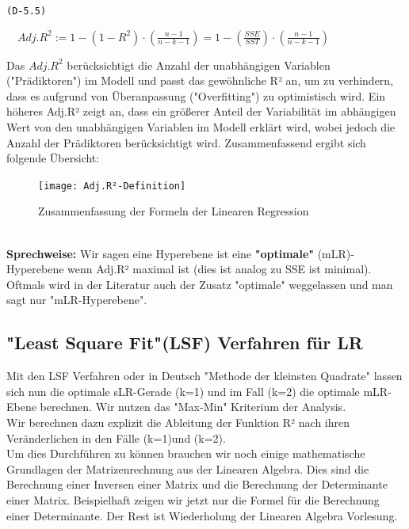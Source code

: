 \documentclass[12pt]{article}
\begin{document}
\begin{center}
\texttt{(D-5.5)}
\begin{large}
\textbf{$ \quad Adj.R^2 := 1 - (1 - R^2) \cdot (\frac{n-1}{n-k-1}) = 1 - (\frac{SSE}{SST}) \cdot (\frac{n-1}{n-k-1}) $}  \\[0.6cm] 
\end{large}     
\end{center}
%
Das $Adj.R^2$ berücksichtigt die Anzahl der unabhängigen Variablen ("Prädiktoren") im Modell und passt das gewöhnliche R² an, um zu verhindern, dass es aufgrund von Überanpassung ("Overfitting") zu optimistisch wird. Ein höheres Adj.R² zeigt an, dass ein größerer Anteil der Variabilität im abhängigen Wert von den unabhängigen Variablen im Modell erklärt wird, wobei jedoch die Anzahl der Prädiktoren berücksichtigt wird. Zusammenfassend ergibt sich folgende Übersicht:
\begin{figure}[htp]
  \centering
  \hspace*{-0.7cm} 
  \texttt{[image: Adj.R²-Definition]}
  \caption{Zusammenfassung der Formeln der Linearen Regression}     
  \label{fig:Zus-Formeln-LR}
\end{figure}
\\[10.5cm]
%
\textbf{Sprechweise:} Wir sagen eine Hyperebene ist eine \textbf{"optimale"} (mLR)- Hyperebene wenn Adj.R² maximal ist (dies ist analog zu SSE ist minimal). Oftmals wird in der Literatur auch der Zusatz "optimale" weggelassen und man sagt nur "mLR-Hyperebene".\\ 


\subsection{"Least Square Fit"(LSF) Verfahren für LR}

Mit den LSF Verfahren oder in Deutsch "Methode der kleinsten Quadrate" lassen sich nun die optimale sLR-Gerade (k=1) und im Fall (k=2) die optimale mLR-Ebene berechnen. Wir nutzen das "Max-Min" Kriterium der Analysis.\\
Wir berechnen dazu explizit die Ableitung der Funktion R² nach ihren Veränderlichen in den Fälle (k=1)und (k=2).\\
Um dies Durchführen zu können brauchen wir noch einige mathematische Grundlagen der Matrizenrechnung aus der Linearen Algebra. Dies sind die Berechnung einer Inversen einer Matrix  und die Berechnung der Determinante einer Matrix. Beispielhaft zeigen wir jetzt nur die Formel für die Berechnung einer Determinante. Der Rest ist Wiederholung der Linearen Algebra Vorlesung.
%
\end{document}
